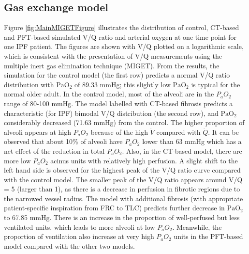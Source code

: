 \subsection{Gas exchange model}
Figure \ref{fig:MainMIGETFigure} illustrates the distribution of control, CT-based and PFT-based simulated V/Q ratio and arterial oxygen at one time point for one IPF patient. The figures are shown with V/Q plotted on a logarithmic scale, which is consistent with the presentation of V/Q measurements using the multiple inert gas elimination technique (MIGET). From the results, the simulation for the control model (the first row) predicts a normal V/Q ratio distribution with $\mathrm{PaO_2}$ of 89.33 mmHg; this slightly low $\mathrm{PaO_2}$ is typical for the normal older adult. In the control model, most of the alveoli are in the $P_aO_2$ range of 80-100 mmHg. The model labelled with CT-based fibrosis predicts a characteristic (for IPF) bimodal V/Q distribution (the second row), and $\mathrm{PaO_2}$ considerably decreased (71.63 mmHg) from the control. The higher proportion of alveoli appears at high $P_aO_2$ because of the high $\dot{V}$ compared with $\dot{Q}$. It can be observed that about 10\% of alveoli have $P_aO_2$ lower than 63 mmHg which has a net effect of the reduction in total $P_aO_2$. Also, in the CT-based model, there are more low $P_aO_2$ acinus units with relatively high perfusion. A slight shift to the left hand side is observed for the highest peak of the V/Q ratio curve compared with the control model. The smaller peak of the V/Q ratio appears around V/Q = 5 (larger than 1), as there is a decrease in perfusion in fibrotic regions due to the narrowed vessel radius. The model with additional fibrosis (with appropriate patient-specific inspiration from FRC to TLC) predicts further decrease in $\mathrm{PaO_2}$ to 67.85 mmHg. There is an increase in the proportion of well-perfused but less ventilated units, which leads to more alveoli at low $P_aO_2$. Meanwhile, the proportion of ventilation also increase at very high $P_aO_2$ units in the PFT-based model compared with the other two models.

